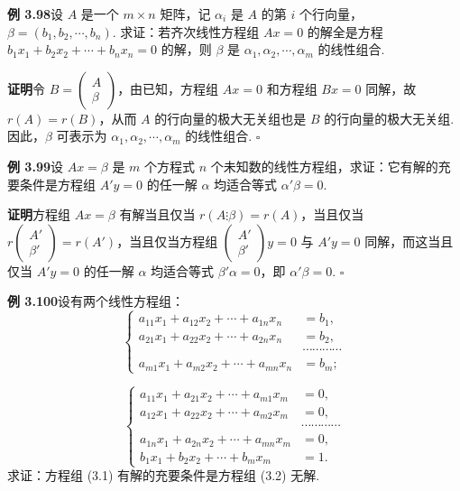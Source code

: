 \documentclass[UTF8, 12pt, fontset=fandol, oneside]{ctexart}
\begin{document}
\noindent\textbf{例 3.98}\quad 设 $A$ 是一个 $m\times n$ 矩阵，记 $\alpha_i$ 是 $A$ 的第 $i$ 个行向量，$\beta=(b_1,b_2,\cdots,b_n)$. 求证：若齐次线性方程组 $Ax=0$ 的解全是方程 $b_1x_1+b_2x_2+\cdots+b_nx_n=0$ 的解，则 $\beta$ 是 $\alpha_1,\alpha_2,\cdots,\alpha_m$ 的线性组合.

\noindent\textbf{证明}\quad 令 $B=\begin{pmatrix}A\\\beta\end{pmatrix}$，由已知，方程组 $Ax=0$ 和方程组 $Bx=0$ 同解，故 $r(A)=r(B)$，从而 $A$ 的行向量的极大无关组也是 $B$ 的行向量的极大无关组. 因此，$\beta$ 可表示为 $\alpha_1,\alpha_2,\cdots,\alpha_m$ 的线性组合. $\square$

\noindent\textbf{例 3.99}\quad 设 $Ax=\beta$ 是 $m$ 个方程式 $n$ 个未知数的线性方程组，求证：它有解的充要条件是方程组 $A'y=0$ 的任一解 $\alpha$ 均适合等式 $\alpha'\beta=0$.

\noindent\textbf{证明}\quad 方程组 $Ax=\beta$ 有解当且仅当 $r(A\vdots\beta)=r(A)$，当且仅当 $r\begin{pmatrix}A'\\\beta'\end{pmatrix}=r(A')$，当且仅当方程组 $\begin{pmatrix}A'\\\beta'\end{pmatrix}y=0$ 与 $A'y=0$ 同解，而这当且仅当 $A'y=0$ 的任一解 $\alpha$ 均适合等式 $\beta'\alpha=0$，即 $\alpha'\beta=0$. $\square$

\noindent\textbf{例 3.100}\quad 设有两个线性方程组：
\begin{equation}
\left\{
\begin{aligned}
a_{11}x_1+a_{12}x_2+\cdots+a_{1n}x_n&=b_1,\\
a_{21}x_1+a_{22}x_2+\cdots+a_{2n}x_n&=b_2,\\
&\cdots\cdots\cdots\cdots\\
a_{m1}x_1+a_{m2}x_2+\cdots+a_{mn}x_n&=b_m;
\end{aligned}
\right.
\tag{3.1}
\end{equation}

\begin{equation}
\left\{
\begin{aligned}
a_{11}x_1+a_{21}x_2+\cdots+a_{m1}x_m&=0,\\
a_{12}x_1+a_{22}x_2+\cdots+a_{m2}x_m&=0,\\
&\cdots\cdots\cdots\cdots\\
a_{1n}x_1+a_{2n}x_2+\cdots+a_{mn}x_m&=0,\\
b_1x_1+b_2x_2+\cdots+b_mx_m&=1.
\end{aligned}
\right.
\tag{3.2}
\end{equation}
求证：方程组 (3.1) 有解的充要条件是方程组 (3.2) 无解.
\end{document}
